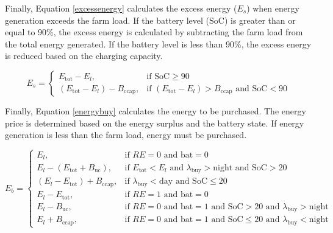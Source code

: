 \documentclass[preprint,12pt]{elsarticle}
\begin{document}
Finally, Equation \ref{excessenergy} calculates the excess energy ($E_{s}$) when energy generation exceeds the farm load. If the battery level ($\text{SoC}$) is greater than or equal to 90\%, the excess energy is calculated by subtracting the farm load from the total energy generated. If the battery level is less than 90\%, the excess energy is reduced based on the charging capacity.

\begin{equation}
\label{excessenergy}
E_{s} = 
\begin{cases}
E_{\text{tot}} - E_{l}, & \text{if SoC} \geq 90 \\
(E_{\text{tot}} - E_{l}) - B_{\text{ccap}}, & \text{if } (E_{\text{tot}} - E_{l}) > B_{\text{ccap}} \text{ and SoC} < 90
\end{cases}
\end{equation}

Finally, Equation \ref{energybuy} calculates the energy to be purchased. The energy price is determined based on the energy surplus and the battery state. If energy generation is less than the farm load, energy must be purchased.

\begin{equation}
\label{energybuy}
E_b = 
\begin{cases}
E_l, & \text{if } RE = 0 \text{ and } \text{bat} = 0 \\
E_l - (E_{\text{tot}} + B_{\text{uc}}), & \text{if } E_{\text{tot}} < E_l \text{ and } \lambda_{\text{buy}} > \text{night} \text{ and SoC} > 20 \\
(E_l - E_{\text{tot}}) + B_{\text{ccap}}, & \text{if } \lambda_{\text{buy}} < \text{day} \text{ and SoC} \leq 20 \\
E_l - E_{\text{tot}}, & \text{if } RE = 1 \text{ and } \text{bat} = 0 \\
E_l - B_{\text{uc}}, & \text{if } RE = 0 \text{ and } \text{bat} = 1 \text{ and SoC} > 20 \text{ and } \lambda_{\text{buy}} > \text{night} \\
E_l + B_{\text{ccap}}, & \text{if } RE = 0 \text{ and } \text{bat} = 1 \text{ and SoC} \leq 20 \text{ and } \lambda_{\text{buy}} < \text{night}
\end{cases}
\end{equation}



\section{}
\end{document}
